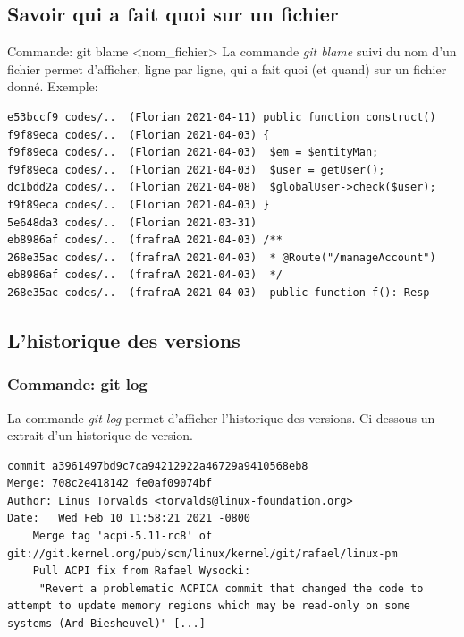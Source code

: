 \documentclass{beamer}
\begin{document}
\subsection{Savoir qui a fait quoi sur un fichier}

\begin{frame}[fragile]{Commande: git blame <nom\_fichier>}
La commande \textit{git blame} suivi du nom d'un fichier permet d'afficher, ligne par ligne, qui a fait quoi (et quand) sur un fichier donné. Exemple:
\begin{mdframed}[style=Bash]
\begin{lstlisting}[style=Bash, caption={Exemple de git blame}]
e53bccf9 codes/..  (Florian 2021-04-11) public function construct()
f9f89eca codes/..  (Florian 2021-04-03) {
f9f89eca codes/..  (Florian 2021-04-03)  $em = $entityMan;
f9f89eca codes/..  (Florian 2021-04-03)  $user = getUser();
dc1bdd2a codes/..  (Florian 2021-04-08)  $globalUser->check($user);
f9f89eca codes/..  (Florian 2021-04-03) }
5e648da3 codes/..  (Florian 2021-03-31) 
eb8986af codes/..  (frafraA 2021-04-03) /**
268e35ac codes/..  (frafraA 2021-04-03)  * @Route("/manageAccount")
eb8986af codes/..  (frafraA 2021-04-03)  */
268e35ac codes/..  (frafraA 2021-04-03)  public function f(): Resp
\end{lstlisting}
\end{mdframed}
\end{frame}

\subsection{L'historique des versions}
\begin{frame}[fragile]
\frametitle{Commande: git log}

La commande \textit{git log} permet d'afficher l'historique des versions. Ci-dessous un extrait d'un historique de version.
\begin{mdframed}[style=Bash]
    \begin{lstlisting}[style=Bash, caption={Exemple de bon message de commit}]
commit a3961497bd9c7ca94212922a46729a9410568eb8
Merge: 708c2e418142 fe0af09074bf
Author: Linus Torvalds <torvalds@linux-foundation.org>
Date:   Wed Feb 10 11:58:21 2021 -0800
    Merge tag 'acpi-5.11-rc8' of git://git.kernel.org/pub/scm/linux/kernel/git/rafael/linux-pm
    Pull ACPI fix from Rafael Wysocki:
     "Revert a problematic ACPICA commit that changed the code to attempt to update memory regions which may be read-only on some systems (Ard Biesheuvel)" [...]
    \end{lstlisting}
\end{mdframed}
\end{frame}
\end{document}
